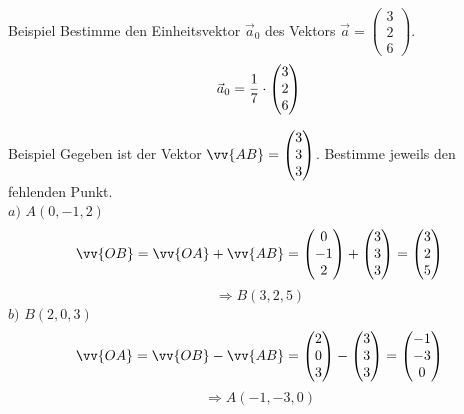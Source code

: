 \documentclass{article}
\begin{document}
\begin{boxx}[DarkBlue]{Beispiel}
    Bestimme den Einheitsvektor $\vec{a}_0$ des Vektors $\vec{a} = \begin{pmatrix}3 \\ 2 \\ 6\end{pmatrix}$.
    \[\vec{a}_0 = \frac{1}{7} \cdot \begin{pmatrix}3\\2\\6\end{pmatrix} \\\]
\end{boxx}
\begin{boxx}[DarkBlue]{Beispiel}
    Gegeben ist der Vektor $\displaystyle \vv{AB} = \begin{pmatrix}3\\3\\3\end{pmatrix}$.
    Bestimme jeweils den fehlenden Punkt. \\
    $a)$\hspace{3mm} $A(0,-1,2)$
    \[\vv{OB} = \vv{OA} + \vv{AB} = \begin{pmatrix}0\\-1\\2\end{pmatrix} + \begin{pmatrix}3\\3\\3\end{pmatrix} = \begin{pmatrix}3\\2\\5\end{pmatrix}\]
    \[\Rightarrow B(3,2,5)\]
    $b)$\hspace{3mm} $B(2,0,3)$
    \[\vv{OA} = \vv{OB} - \vv{AB} = \begin{pmatrix}2\\0\\3\end{pmatrix} - \begin{pmatrix}3\\3\\3\end{pmatrix} = \begin{pmatrix}-1\\-3\\0\end{pmatrix}\]
    \[\Rightarrow A(-1,-3,0)\]
\end{boxx}
\newpage
\end{document}
